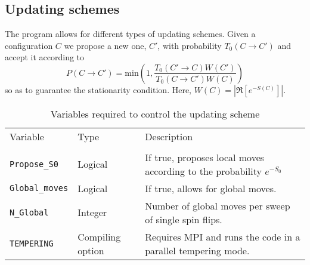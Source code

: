 
\subsection{Updating schemes}\label{sec:updating}
%
The program allows for different types of updating schemes.    Given a configuration $C$ we propose a new one, $C'$, with probability $T_0(C \rightarrow C')$  and accept it according to 
\begin{equation}
	P(C \rightarrow C') =  \text{min}  \left( 1, \frac{T_0(C' \rightarrow C) W(C')}{T_0(C \rightarrow C') W(C)} \right)
\end{equation}
so as to guarantee the stationarity condition.  Here, $ W(C) = \left| \Re \left[ e^{-S(C)} \right] \right|   $.

\begin{table}[h]
   \begin{tabular}{@{} l l l @{}}\toprule
        Variable  &  Type                  &  Description   \\
         \\\midrule
       \texttt{Propose\_S0}   &    Logical       &  If true, proposes local moves according to the probability $e^{-S_0}$ \\
       \texttt{Global\_moves} & Logical       & If true, allows for global moves. \\
        \texttt{N\_Global }       & Integer        &   Number of global moves per sweep of single spin flips. \\
        \texttt{TEMPERING}   & Compiling option &    Requires MPI and  runs the code in a parallel tempering mode. 
         \\\bottomrule
   \end{tabular}
   \caption{   Variables  required to control the updating scheme    \label{table:Updating_schemes}}
\end{table}
% 
